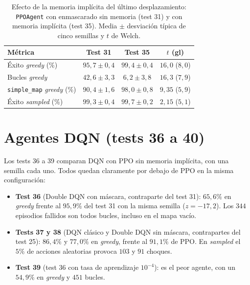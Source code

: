 \begin{table}[htbp]
    \centering
    \caption[Efecto de la memoria implícita (tests 31 y 35)]{Efecto de la
    memoria implícita del último desplazamiento: \texttt{PPOAgent} con
    enmascarado sin memoria (test 31) y con memoria implícita (test 35).
    Media $\pm$ desviación típica de cinco semillas y $t$ de Welch.}
    \label{tab:res_memoria}
    \begin{tabular}{lccc}
        \toprule
        \textbf{Métrica} & \textbf{Test 31} & \textbf{Test 35} & \textbf{$t$ (gl)} \\
        \midrule
        Éxito \textit{greedy} (\%) & $95{,}7 \pm 0{,}4$ & $99{,}4 \pm 0{,}4$ & $16{,}0$ ($8{,}0$) \\
        Bucles \textit{greedy} & $42{,}6 \pm 3{,}3$ & $6{,}2 \pm 3{,}8$ & $16{,}3$ ($7{,}9$) \\
        \texttt{simple\_map} \textit{greedy} (\%) & $90{,}4 \pm 1{,}6$ & $98{,}0 \pm 0{,}8$ & $9{,}35$ ($5{,}9$) \\
        Éxito \textit{sampled} (\%) & $99{,}3 \pm 0{,}4$ & $99{,}7 \pm 0{,}2$ & $2{,}15$ ($5{,}1$) \\
        \bottomrule
    \end{tabular}
\end{table}

\section{Agentes DQN (tests 36 a 40)}\label{sec:res_dqn}
Los tests 36 a 39 comparan DQN con PPO sin memoria implícita, con una
semilla cada uno. Todos quedan claramente por debajo de PPO en la misma
configuración:
\begin{itemize}
    \item \textbf{Test 36} (Double DQN con máscara, contraparte del test
    31): $65{,}6\%$ en \textit{greedy} frente al $95{,}9\%$ del test 31
    con la misma semilla ($z = -17{,}2$). Los $344$ episodios fallidos son
    todos bucles, incluso en el mapa vacío.
    \item \textbf{Tests 37 y 38} (DQN clásico y Double DQN sin máscara,
    contrapartes del test 25): $86{,}4\%$ y $77{,}0\%$ en
    \textit{greedy}, frente al $91{,}1\%$ de PPO. En \textit{sampled} el
    $5\%$ de acciones aleatorias provoca $103$ y $91$ choques.
    \item \textbf{Test 39} (test 36 con tasa de aprendizaje $10^{-4}$): es
    el peor agente, con un $54{,}9\%$ en \textit{greedy} y $451$ bucles.
\end{itemize}

